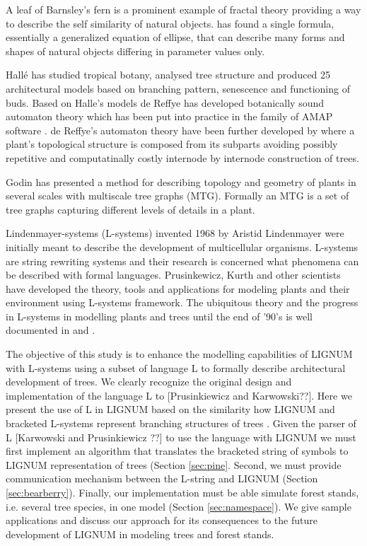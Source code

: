 A leaf  of Barnsley's fern \citep{barnsley:00} is  a prominent example
of fractal theory  providing a way to describe  the self similarity of
natural  objects.  \citet{gielis:03}   has  found  a  single  formula,
essentially a generalized equation  of ellipse, that can describe many
forms and shapes of natural objects differing in parameter values only.

Hall\'e  \citep{halle:78} has studied  tropical botany,  analysed tree
structure  and produced  25  architectural models  based on  branching
pattern, senescence and functioning  of buds.  Based on Halle's models
de  Reffye   \citep[overview][]{dereffye:89,  jaeger:92,  dereffye:95,
  dereffye:97} has developed  botanically sound automaton theory which
has  been   put  into  practice   in  the  family  of   AMAP  software
\citep{fourcard:97}.  de  Reffye's automaton theory  have been further
developed by  \citet{yan:01} where a plant's  topological structure is
composed   from  its   subparts  avoiding   possibly   repetitive  and
computatinally costly internode by internode construction of trees.

Godin \citep{godin:99} has presented  a method for describing topology
and geometry of  plants in several scales with  multiscale tree graphs
(MTG).  Formally an  MTG  is  a set  of  tree graphs  \citep{godin:98}
capturing different levels of details in a plant.

Lindenmayer-systems (L-systems)  invented 1968 by  Aristid Lindenmayer
\citep{lindenmayer:68,   lindenmayer:71}  were   initially   meant  to
describe  the development of  multicellular organisms.   L-systems are
string  rewriting  systems  and   their  research  is  concerned  what
phenomena can be described with formal languages.  Prusinkewicz, Kurth
and other scientists have developed the theory, tools and applications
for modeling  plants and their environment  using L-systems framework.
The  ubiquitous theory  and  the progress  in  L-systems in  modelling
plants  and  trees  until the  end  of  '90's  is well  documented  in
\citet{pp:96,pp:99} and \citet{kurth:99}.

The objective of  this study is to enhance  the modelling capabilities
of  LIGNUM with L-systems  using a  subset of  language L  to formally
describe architectural development of trees.  We clearly recognize the
original design and implementation of the language L to [Prusinkiewicz
and Karwowski??].  Here we present the use of L in LIGNUM based on the
similarity  how  LIGNUM and  bracketed  L-systems represent  branching
structures  of  trees  \citep{perttunen:96,perttunen:01}.   Given  the
parser of L [Karwowski and  Prusinkiewicz ??] to use the language with
LIGNUM  we  must first  implement  an  algorithm  that translates  the
bracketed string of symbols to LIGNUM representation of trees (Section
\ref{sec:pine}.   Second,  we  must  provide  communication  mechanism
between  the   L-string  and  LIGNUM   (Section  \ref{sec:bearberry}).
Finally, our implementation must  be able simulate forest stands, i.e.
several tree  species, in one model  (Section \ref{sec:namespace}). We
give sample applications and discuss our approach for its consequences
to  the future  development of  LIGNUM  in modeling  trees and  forest
stands.

